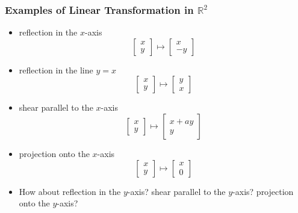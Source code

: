 \documentclass{beamer}
\newcommand{\Real}{\ensuremath{\mathbb{R}}}
\begin{document}
\begin{frame}
  \frametitle{Examples of Linear Transformation in $\Real^2$}


\begin{itemize}
\item reflection in the $x$-axis
\[
\left[
\begin{array}{c}
x \\ y 
\end{array}
\right]
\mapsto
\left[
\begin{array}{c}
x \\ -y 
\end{array}
\right]
\]

\item reflection in the line $y = x$
\[
\left[
\begin{array}{c}
x \\ y 
\end{array}
\right]
\mapsto
\left[
\begin{array}{c}
y \\ x 
\end{array}
\right]
\]

\item shear parallel to the $x$-axis
\[
\left[
\begin{array}{c}
x \\ y 
\end{array}
\right]
\mapsto
\left[
\begin{array}{c}
x+ay \\ y 
\end{array}
\right]
\]

\item projection onto the $x$-axis
\[
\left[
\begin{array}{c}
x \\ y 
\end{array}
\right]
\mapsto
\left[
\begin{array}{c}
x \\ 0 
\end{array}
\right]
\]


\item How about reflection in the $y$-axis? shear parallel to the $y$-axis? projection onto the $y$-axis?

\end{itemize}

\end{frame}
\end{document}
